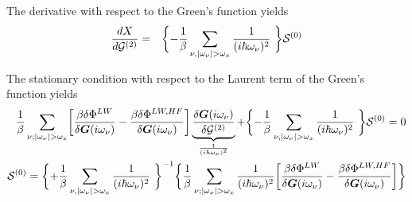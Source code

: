 \documentclass[11pt,a4paper]{report}
\begin{document}
The derivative with respect to the Green's function yields
\begin{eqnarray}
\frac{dX}{d\mathcal{\mat{G}}^{(2)}}
&=&
\biggl\lbrace
-\frac{1}{\beta}\sum_{\nu,|\omega_\nu|>\omega_x}\frac{1}{(i\hbar\omega_\nu)^2}\
\biggr\rbrace
\mathcal{\mat{S}}^{(0)}
\end{eqnarray}

The stationary condition with respect to the Laurent term of the
Green's function yields
\begin{eqnarray}
\frac{1}{\beta}\sum_{\nu;|\omega_\nu|>\omega_x}
\biggl[
\frac{\beta\delta\Phi^{LW}}{\delta\mat{G}(i\omega_\nu)}
-\frac{\beta\delta\Phi^{LW,HF}}{\delta\mat{G}(i\omega_\nu)}
\biggr]
\underbrace{
\frac{\delta\mat{G}(i\omega_\nu)}{\delta\mathcal{\mat{G}}^{(2)}}
}_{\frac{1}{(i\hbar\omega_\nu)^2}}
+
\biggl\lbrace
-\frac{1}{\beta}\sum_{\nu,|\omega_\nu|>\omega_x}\frac{1}{(i\hbar\omega_\nu)^2}\
\biggr\rbrace
\mathcal{\mat{S}}^{(0)}=0
%
\nonumber\\
\mathcal{\mat{S}}^{(0)}=
\biggl\lbrace
+\frac{1}{\beta}\sum_{\nu,|\omega_\nu|>\omega_x}\frac{1}{(i\hbar\omega_\nu)^2}\
\biggr\rbrace^{-1}
\biggl\lbrace
\frac{1}{\beta}\sum_{\nu;|\omega_\nu|>\omega_x}
\frac{1}{(i\hbar\omega_\nu)^2}
\biggl[
\frac{\beta\delta\Phi^{LW}}{\delta\mat{G}(i\omega_\nu)}
-\frac{\beta\delta\Phi^{LW,HF}}{\delta\mat{G}(i\omega_\nu)}
\biggr]
\biggr\rbrace
\end{eqnarray}


\end{document}
